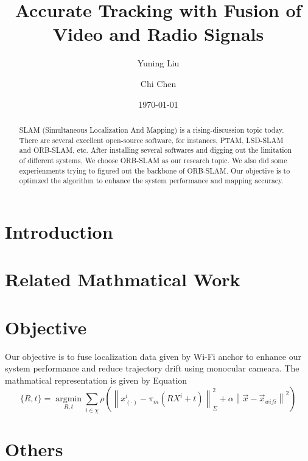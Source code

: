 \documentclass[twocolumn]{article}
\title{Accurate Tracking with Fusion of Video and Radio Signals}
\author{Yuning Liu}
\author{Chi Chen}
\affil{University of New South Wales}
\date{\today}
\begin{document}
\maketitle
\begin{abstract}
    SLAM (Simultaneous Localization And Mapping) is a rising-discussion topic today. There are several excellent open-source software, for instances, PTAM, LSD-SLAM and ORB-SLAM, etc. After installing several softwares and digging out the limitation of different systems, We choose ORB-SLAM as our research topic. We also did some experienments trying to figured out the backbone of ORB-SLAM. Our objective is to optimzed the algorithm to enhance the system performance and mapping accuracy. 
\end{abstract}

\section{Introduction}

\section{Related Mathmatical Work}

\section{Objective}

Our objective is to fuse localization data given by Wi-Fi anchor to enhance our system performance and reduce trajectory drift using monocular cameara. The mathmatical representation is given by Equation \label{wifi math}
\begin{equation}
    \{R, t\} = \operatorname*{argmin}_{R, t} \sum_{i\in \chi} \rho(\left\|x^i_{(\cdot)}-\pi_{m}(RX^i+t)\right\|^2_\Sigma+\alpha\left\|\vec{x}-\vec{x}_{wifi}\right\|^2) \label{wifi math}
\end{equation}

\section{Others}
\end{document}

